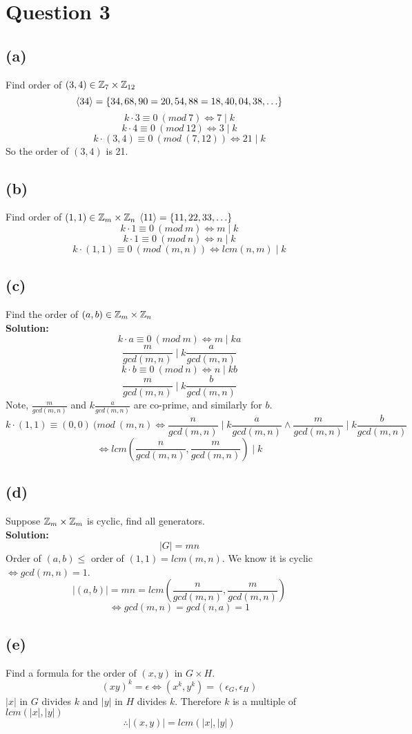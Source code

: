 \documentclass[openany]{report}
\begin{document}
\section{Question 3}
\subsection{(a)}
Find order of $(3,4) \in \mathbb{Z}_7 \times \mathbb{Z}_{12}$
$$\langle 34 \rangle = \{34,68, 90 = 20, 54, 88=18, 40, 04, 38, \ldots \}$$
$$k \cdot 3 \equiv 0 \ (mod \ 7) \iff 7 \mid k$$
$$k \cdot 4 \equiv 0 \ (mod \ 12) \iff 3 \mid k$$
$$k \cdot (3,4) \equiv 0 \ (mod \ (7,12)) \iff 21 \mid k$$
So the order of $(3,4)$ is 21.
\subsection{(b)}
Find order of $(1,1) \in \mathbb{Z}_m \times \mathbb{Z}_n$
$\langle 11 \rangle = \{11,22,33, \ldots\}$
$$k \cdot 1 \equiv 0 \ (mod \ m) \iff m \mid k$$
$$k \cdot 1 \equiv 0 \ (mod \ n) \iff n \mid k$$
$$k \cdot (1,1) \equiv 0 \ (mod \ (m,n)) \iff lcm(n,m) \mid k$$
\subsection{(c)} Find the order of $(a,b) \in \mathbb{Z}_m \times \mathbb{Z}_n$\\[3ex]
\textbf{Solution:}
$$k \cdot a \equiv 0 \ (mod \ m) \iff m \mid ka$$
$$\frac{m}{gcd(m,n)} \mid k\frac{a}{gcd(m,n)}$$
$$k \cdot b \equiv 0 \ (mod \ n) \iff n \mid kb$$
$$\frac{m}{gcd(m,n)} \mid k\frac{b}{gcd(m,n)}$$
Note, $\frac{m}{gcd(m,n)}$ and $k\frac{a}{gcd(m,n)}$ are co-prime, and similarly for $b$.
$$k \cdot (1,1) \equiv (0,0) \ (mod \ (m,n) \iff \frac{n}{gcd(m,n)} \mid k\frac{a}{gcd(m,n)} \wedge \frac{m}{gcd(m,n)} \mid k\frac{b}{gcd(m,n)}$$
$$\iff lcm\left(\frac{n}{gcd(m,n)}, \frac{m}{gcd(m,n)}\right) \mid k$$
\subsection{(d)}
Suppose $\mathbb{Z}_m \times \mathbb{Z}_m$ is cyclic, find all generators.\\[3ex]
\textbf{Solution:}
$$|G| = mn$$
Order of $(a,b) \leq$ order of $(1,1) = lcm(m,n)$. We know it is cyclic $\iff gcd(m,n) = 1$. 
$$|(a,b)| = mn = lcm\left(\frac{n}{gcd(m,n)}, \frac{m}{gcd(m,n)}\right) $$
$$\iff gcd(m,n) = gcd(n,a) = 1$$
\subsection{(e)}
Find a formula for the order of $(x,y)$ in $G \times H$. 
$$(xy)^k = \epsilon \iff (x^k, y^k) = (\epsilon_G, \epsilon_H)$$
$|x|$ in $G$ divides $k$ and $|y|$ in $H$ divides $k$. Therefore $k$ is a multiple of $lcm(|x|, |y|)$
$$\therefore |(x,y)| = lcm(|x|,|y|)$$
\end{document}
